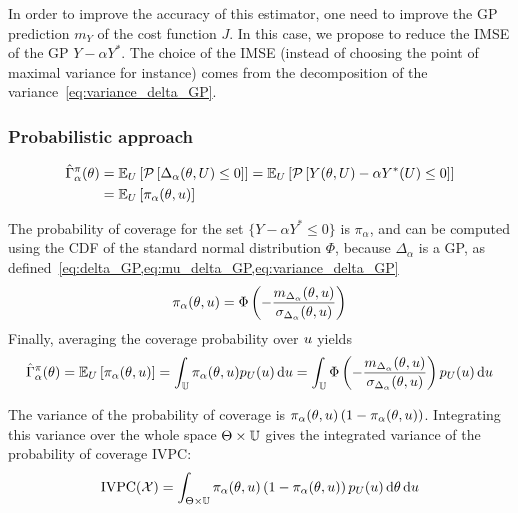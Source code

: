 \documentclass[../../Main_ManuscritThese.tex]{subfiles}
\begin{document}
  In order to improve the accuracy of this estimator, one need to improve the GP prediction $m_Y$ of the cost function $J$.
  In this case, we propose to reduce the IMSE of the GP $Y - \alpha Y^*$. The choice of the IMSE (instead of choosing the point of maximal variance for instance) comes from the decomposition of the variance~\cref{eq:variance_delta_GP}. 
  
  \subsubsection{Probabilistic approach}
\begin{align}
  \hat{\Gamma}_{\alpha}^{\pi}(\theta) &= \mathbb{E}_U\left[ \mathcal{P}\left[ \Delta_{\alpha}(\theta,U) \leq 0\right]\right] = \mathbb{E}_U\left[ \mathcal{P}\left[ Y(\theta, U) - \alpha Y^*(U) \leq 0\right]\right] \\ &= \mathbb{E}_U\left[\pi_{\alpha}(\theta,u)\right]
\end{align}

  
The probability of coverage for the set $\{Y - \alpha Y^*\leq 0\}$ is $\pi_{\alpha}$, and can be computed using the CDF of the standard normal distribution $\Phi$, because $\Delta_{\alpha}$ is a GP, as defined~\cref{eq:delta_GP,eq:mu_delta_GP,eq:variance_delta_GP}
\begin{equation}
  \label{eq:def_pialphaku}
  \pi_{\alpha}(\theta,u) = \Phi\left(-\frac{m_{\Delta_\alpha}(\theta,u)}{\sigma_{\Delta_\alpha}(\theta,u)}\right)
\end{equation}
Finally, averaging the coverage probability over $u$ yields
\begin{equation}
  \hat{\Gamma}_{\alpha}^{\pi}(\theta) = \mathbb{E}_U\left[\pi_{\alpha}(\theta,u)\right]=\int_{\mathbb{U}}\pi_{\alpha}(\theta,u)p_{U}(u) \,\mathrm{d}u = \int_{\mathbb{U}}\Phi\left(-\frac{m_{\Delta_\alpha}(\theta,u)}{\sigma_{\Delta_\alpha}(\theta,u)}\right)p_{U}(u) \,\mathrm{d}u
\end{equation}

The variance of the probability of coverage is $\pi_\alpha(\theta, u) \left(1 - \pi_{\alpha}(\theta,u)\right)$.
Integrating this variance over the whole space $\Theta \times \mathbb{U}$ gives the integrated variance of the probability of coverage $\mathrm{IVPC}$:
\begin{equation}
\mathrm{IVPC}(\mathcal{X}) =  \int_{\Theta \times \mathbb{U}} \pi_{\alpha}(\theta, u) \left(1 - \pi_{\alpha}(\theta, u)\right)p_{U}(u)\,\mathrm{d}\theta \,\mathrm{d}u
\end{equation}
\end{document}
